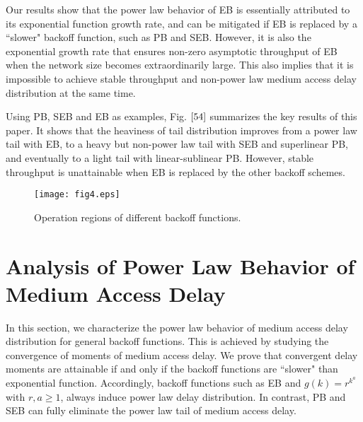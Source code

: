 \documentclass[journal]{IEEEtran}
\begin{document}
Our results show that the power law behavior of EB is essentially attributed to its exponential function growth rate, and can be mitigated if EB is replaced by a ``slower" backoff function, such as PB and SEB. However, it is also the exponential growth rate that ensures non-zero asymptotic throughput of EB when the network size becomes extraordinarily large. This also implies that it is impossible to achieve stable throughput and non-power law medium access delay distribution at the same time.

Using PB, SEB and EB as examples, Fig. $\ref{54}$ summarizes the key results of this paper. It shows that the heaviness of tail distribution improves from a power law tail with EB, to a heavy but non-power law tail with SEB and superlinear PB, and eventually to a light tail with linear-sublinear PB. However, stable throughput is unattainable when EB is replaced by the other backoff schemes.

\begin{figure}
\centering
  \begin{center}
    \texttt{[image: fig4.eps]}
  \end{center}
  \caption{Operation regions of different backoff functions.}
  \label{54}
\end{figure}

\section{Analysis of Power Law Behavior of Medium Access Delay}
In this section, we characterize the power law behavior of medium access delay distribution for general backoff functions. This is achieved by studying the convergence of moments of medium access delay. We prove that convergent delay moments are attainable if and only if the backoff functions are ``slower" than exponential function. Accordingly, backoff functions such as EB and $g(k)=r^{k^a}$ with $r,a\geq 1$, always induce power law delay distribution. In contrast, PB and SEB can fully eliminate the power law tail of medium access delay.
\end{document}
